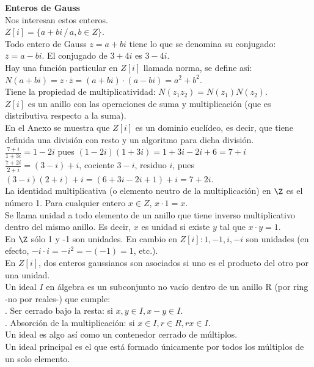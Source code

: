 \textbf{Enteros de Gauss} \\
Nos interesan estos enteros. \\
$Z[i] = \{a+bi \, / \, a,b \in Z\}$. \\
Todo entero de Gauss $z = a+bi$ tiene lo que se denomina su conjugado: $\overline{z} =a-bi$. El conjugado de $3+4i$ es $3-4i$. \\
Hay una función particular en $Z[i]$ llamada norma, se define así: \\
$N(a+bi) = z \cdot \overline{z} = (a+bi) \cdot (a-bi) = a^2+b^2$.\\
Tiene la propiedad de multiplicatividad: $N(z_1z_2) =N(z_1)N(z_2)$. \\
$Z[i]$ es un anillo con las operaciones de suma y multiplicación (que es distributiva respecto a la suma). \\
En el Anexo se muestra que $Z[i]$ es un dominio euclídeo, es decir, que tiene definida una división con resto y un algoritmo para dicha división. \\
$\frac{7+i}{1+3i} = 1-2i$ pues $(1-2i)(1+3i) = 1+3i-2i+6 = 7+i$ \\
$\frac{7+2i}{2+i} = (3-i) + i$, cociente $3-i$, residuo $i$, pues $(3-i)(2+i) + i = (6+3i-2i+1) + i = 7+2i$. \\
La identidad multiplicativa (o elemento neutro de la multiplicación) en $\Z$ es el número 1. Para cualquier entero $x \in Z$, $x \cdot 1 = x$. \\
Se llama unidad a todo elemento de un anillo que tiene inverso multiplicativo dentro del mismo anillo. Es decir, $x$ es unidad si existe $y$ tal que $x \cdot y = 1$. \\
En $\Z$ sólo 1 y -1 son unidades.
En cambio en $Z[i]: 1,-1,i,-i$ son unidades (en efecto, $-i \cdot i = -i^2 = -(-1) = 1$, etc.). \\
En  $Z[i]$, dos enteros gaussianos son asociados si uno es el producto del otro por una unidad. \\
Un ideal $I$ en álgebra es un subconjunto no vacío dentro de un anillo R (por ring -no por reales-) que cumple: \\
. Ser cerrado bajo la resta: si $x,y \in I, x-y \in I$. \\
. Absorción de la multiplicación: si $x \in I, r \in R, rx \in I$. \\
Un ideal es algo así como un contenedor cerrado de múltiplos. \\
Un ideal principal es el que está formado únicamente por todos los múltiplos de un solo elemento. \\

